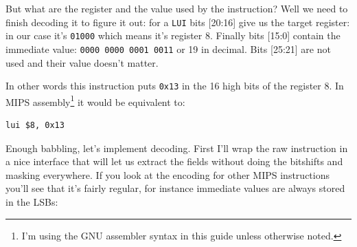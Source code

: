 \documentclass[a4paper]{article}
\newcommand{\code}[1] {\texttt{#1}}
\begin{document}
But what are the register and the value used by the instruction? Well
we need to finish decoding it to figure it out: for a \code{LUI}
bits [20:16] give us the target register: in our case it's
\code{01000} which means it's register 8. Finally bits [15:0]
contain the immediate value: \code{0000 0000 0001 0011} or 19 in
decimal. Bits [25:21] are not used and their value doesn't matter.

In other words this instruction puts \code{0x13} in the 16 high bits
of the register 8. In MIPS assembly\footnote{I'm using the GNU
  assembler syntax in this guide unless otherwise noted.} it would be
equivalent to:

\begin{lstlisting}[language=assembly]
lui $8, 0x13
\end{lstlisting}

Enough babbling, let's implement decoding. First I'll wrap the raw
instruction in a nice interface that will let us extract the fields
without doing the bitshifts and masking everywhere. If you look at the
encoding for other MIPS instructions you'll see that it's fairly
regular, for instance immediate values are always stored in the LSBs:
\end{document}
